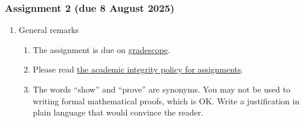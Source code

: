 \documentclass{amsart}
\begin{document}
\subsubsection{Assignment 2 (due 8 August 2025)}
\label{sec:orga207ff7}
\begin{enumerate}
\item General remarks
\label{sec:orgf0792ef}
\begin{enumerate}
\item The assignment is due on \href{https://www.gradescope.com/courses/1070433}{gradescope}.

\item Please read \href{https://canvas.anu.edu.au/courses/2640/pages/academic-integrity-policy-for-assignments}{the academic integrity policy for assignments}.

\item The words ``show'' and ``prove'' are synonyms. You may not be used to writing formal mathematical proofs, which is OK.  Write a justification in plain language that would convince the reader.


\end{enumerate}
\end{enumerate}
\end{document}
